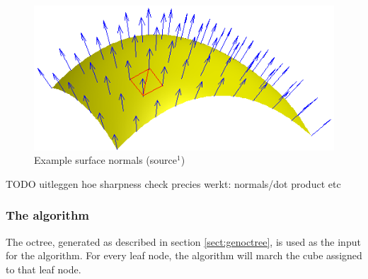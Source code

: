 \documentclass[a4paper,10pt,twocolumn]{article}
\begin{document}

    \begin{figure}[h]
        \begin{center}
            \includegraphics[scale=0.4]{./images/Surface_normal}
        \end{center}
        \caption{Example surface normals (source$^1$)}
        \label{figure:surface_normal}
    \end{figure}
TODO uitleggen hoe sharpness check precies werkt: normals/dot product etc

\subsubsection{The algorithm}

The octree, generated as described in section \ref{sect:genoctree}, is used as the input for the algorithm. For every leaf node, the algorithm will march the cube assigned to that leaf node.
\end{document}
